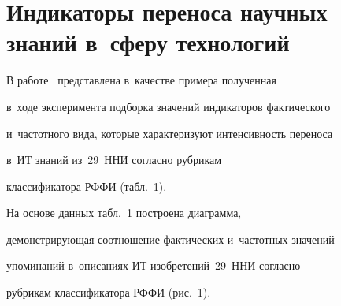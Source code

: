 \vspace*{-8pt}





\section{Индикаторы переноса научных знаний в~сферу технологий}





\vspace*{-3pt}


      


     В работе~\cite{1-mins} представлена в~качестве примера полученная 


в~ходе эксперимента подборка значений индикаторов фактического 


и~частотного вида, которые характеризуют интенсивность переноса  


в~ИТ знаний из~29~ННИ согласно рубрикам 


классификатора РФФИ (табл.~1).


       














     На основе данных табл.~1 построена диаграмма, 


демонстрирующая соотношение фактических и~частотных значений 


упоминаний в~описаниях ИТ-изоб\-ре\-те\-ний~29~ННИ согласно 


рубрикам классификатора РФФИ  (рис.~1). 


\addtocounter{table}{-1}






